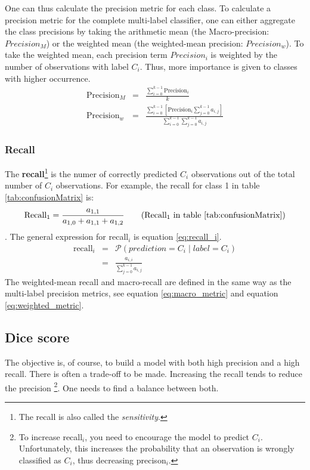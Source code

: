 \par{
    One can thus calculate the precision metric for each class. 
    To calculate a precision metric for the complete multi-label classifier,
    one can either aggregate the class precisions by taking the arithmetic mean (the Macro-precision: $Precision_M$) or the weighted mean (the weighted-mean precision: $Precision_w$).
    To take the weighted mean, each precision term $Precision_i$ is weighted by the number of observations with label $C_i$. Thus, more importance is given to classes with higher occurrence. 
    \begin{eqnarray}
        \text{Precision}_M &=& \frac{\sum_{i=0}^{k-1} \text{Precision}_i}{k}  \label{eq:macro_metric}\\
        \text{Precision}_w &=& \frac{\sum_{i=0}^{k-1} \left[ \text{Precision}_i \sum_{j=0}^{k-1} a_{i,j} \right] }{\sum_{i=0}^{k-1} \sum_{j=0}^{k-1} a_{i,j} }  \label{eq:weighted_metric}
    \end{eqnarray}
}
\subsubsection{Recall}
\par{
    The \textbf{recall}\footnote{The recall is also called the \textit{sensitivity}.} is the numer of correctly predicted $C_i$ observations out of the total number of $C_i$ observations.
    For example, the recall for class 1 in table \ref{tab:confusionMatrix} is:
    \begin{equation}
        \text{Recall}_1 = \frac{a_{1,1}}{a_{1,0} + a_{1,1} + a_{1,2}} \tag{Recall$_1$ in table \ref{tab:confusionMatrix}}
    \end{equation}.
    The general expression for recall$_i$ is equation \ref{eq:recall_i}.
    \begin{eqnarray}
        \text{recall}_i &=& \mathcal{P} \left( prediction = C_i \mid label = C_i \right) \\
        &=& \frac{a_{i, i}}{\sum_{j=0}^{k-1} a_{i,j}} \label{eq:recall_i}
    \end{eqnarray}
    The weighted-mean recall and macro-recall are defined in the same way as the multi-label precision metrics, see equation \ref{eq:macro_metric} and equation \ref{eq:weighted_metric}.
}
\subsection{Dice score\label{sec:dice}}
\par{
    The objective is, of course, to build a model with both high precision and a high recall.
    There is often a trade-off to be made. 
    Increasing the recall tends to reduce the precision
    \footnote{To increase recall$_i$, you need to encourage the model to predict $C_i$. Unfortunately, this increases the probability that an observation is wrongly classified as $C_i$, thus decreasing precison$_i$.}.
    One needs to find a balance between both.
}

